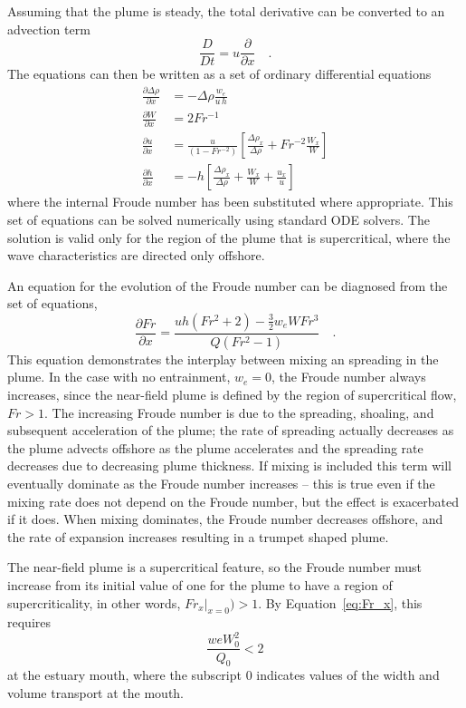 \documentclass[12pt]{article}
\begin{document}
Assuming that the plume is steady, the total derivative can be converted to an advection term
\begin{equation}
    \frac{D}{Dt} = u\frac{\partial}{\partial x} \quad .
\end{equation}
The equations can then be written as a set of ordinary differential equations
\begin{align}
\frac{\partial \Delta\rho}{\partial x} &= - \Delta \rho \frac{w_e}{u\,h} \label{eq:mass_sys}\\
\frac{\partial W}{\partial x} &=  2 Fr^{-1}\label{eq:width_sys}\\
\frac{\partial u}{\partial x} &= \frac{u}{(1 - Fr^{-2})}\left[ \frac{\Delta \rho_x}{\Delta \rho} + Fr^{-2} \frac{W_x}{W} \right] \label{eq:moment_sys}\\
\frac{\partial h}{\partial x} &= - h \left[  \frac{\Delta\rho_x}{\Delta\rho} + \frac{W_x}{W} +  \frac{u_x}{u} \right] \label{eq:cont_sys}
\end{align}
where the internal Froude number has been substituted where appropriate. This set of equations can be solved numerically using standard ODE solvers. The solution is valid only for the region of the plume that is supercritical, where the wave characteristics are directed only offshore.

An equation for the evolution of the Froude number can be diagnosed from the set of equations, 
\begin{equation}
\frac{\partial Fr}{\partial x} = \frac{ u h (Fr^2+2) - \frac{3}{2} w_e W  Fr^3}{ Q (Fr^2-1)} \quad .
\label{eq:Fr_x}
\end{equation}
This equation demonstrates the interplay between mixing an spreading in the plume. In the case with no entrainment, $w_e = 0$, the Froude number always increases, since the near-field plume is defined by the region of supercritical flow, $Fr>1$. The increasing Froude number is due to the spreading, shoaling, and subsequent acceleration of the plume; the rate of spreading actually decreases as the plume advects offshore as the plume accelerates and the spreading rate decreases due to decreasing plume thickness. If mixing is included this term will eventually dominate as the Froude number increases -- this is true even if the mixing rate does not depend on the Froude number, but the effect is exacerbated if it does. When mixing dominates, the Froude number decreases offshore, and the rate of expansion increases resulting in a trumpet shaped plume. 

The near-field plume is a supercritical feature, so the Froude number must increase from its initial value of one for the plume to have a region of supercriticality, in other words, $Fr_x|_{x=0}) > 1$. By Equation~\ref{eq:Fr_x}, this requires
\begin{equation}
    \frac{we W_0^2}{Q_0} < 2
    \label{eq:criticality}
\end{equation}
at the estuary mouth, where the subscript $0$ indicates values of the width and volume transport at the mouth.
\end{document}
